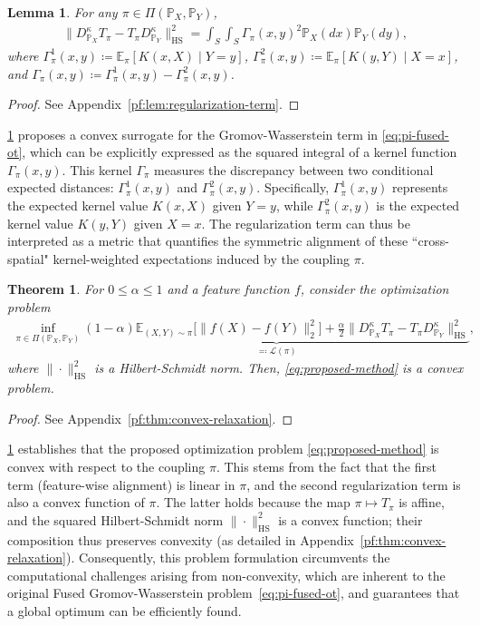 \documentclass{article}
\newtheorem{theorem}{Theorem}
\newtheorem{lemma}{Lemma}
\begin{document}
\begin{lemma}
	\label{lem:regularization-term}
	For any $\pi \in \Pi(\mathbb{P}_X,\mathbb{P}_Y)$,
	\begin{align*}
		\| D_{\mathbb{P}_X}^{\kappa}T_{\pi} - T_{\pi}D_{\mathbb{P}_Y}^{\kappa} \|_{\mathrm{HS}}^2 = \int_S\int_S \Gamma_\pi(x,y)^2\mathbb{P}_X(dx)\mathbb{P}_Y(dy) ,
	\end{align*}
	where $\Gamma_\pi^1(x,y) \coloneqq \mathbb{E}_\pi[K(x,X) \mid Y = y]$, $\Gamma_\pi^2(x,y) \coloneqq \mathbb{E}_\pi[K(y,Y) \mid X = x]$, and $\Gamma_\pi(x,y) \coloneqq \Gamma_\pi^1(x,y) - \Gamma_\pi^2(x,y)$.
\end{lemma}
\begin{proof}
	See Appendix~\ref{pf:lem:regularization-term}.
\end{proof}
\cref{lem:regularization-term} proposes a convex surrogate for the Gromov-Wasserstein term in \eqref{eq:pi-fused-ot}, which can be explicitly expressed as the squared integral of a kernel function $\Gamma_\pi(x,y)$. This kernel $\Gamma_\pi$ measures the discrepancy between two conditional expected distances: $\Gamma_\pi^1(x,y)$ and $\Gamma_\pi^2(x,y)$. Specifically, $\Gamma_\pi^1(x,y)$ represents the expected kernel value $K(x,X)$ given $Y=y$, while $\Gamma_\pi^2(x,y)$ is the expected kernel value $K(y,Y)$ given $X=x$. The regularization term can thus be interpreted as a metric that quantifies the symmetric alignment of these ``cross-spatial" kernel-weighted expectations induced by the coupling $\pi$.

\begin{theorem}
	\label{thm:convex-relaxation}
	For $0 \leq \alpha \leq 1$ and a feature function $f$, consider the optimization problem 
	\begin{align}
		\label{eq:proposed-method}
		\inf_{\pi\in\Pi(\mathbb{P}_X,\mathbb{P}_Y)} \underbrace{(1-\alpha)\mathbb{E}_{(X,Y)\sim\pi}\big[\|f(X)-f(Y)\|_2^2\big] + \frac{\alpha}{2} \| D_{\mathbb{P}_X}^{\kappa}T_\pi - T_\pi D_{\mathbb{P}_Y}^{\kappa} \|_{\mathrm{HS}}^2}_{ \eqqcolon \mathcal{L}(\pi)} ,
	\end{align}
	where $\|\cdot\|_{\mathrm{HS}}^2$ is a Hilbert-Schmidt norm. Then, \eqref{eq:proposed-method} is a convex problem.
\end{theorem}
\begin{proof}
	See Appendix~\ref{pf:thm:convex-relaxation}.
\end{proof}
\cref{thm:convex-relaxation} establishes that the proposed optimization problem \eqref{eq:proposed-method} is convex with respect to the coupling $\pi$. This stems from the fact that the first term (feature-wise alignment) is linear in $\pi$, and the second regularization term is also a convex function of $\pi$. The latter holds because the map $\pi \mapsto T_\pi$ is affine, and the squared Hilbert-Schmidt norm $\|\cdot\|_{\mathrm{HS}}^2$ is a convex function; their composition thus preserves convexity (as detailed in Appendix~\ref{pf:thm:convex-relaxation}). Consequently, this problem formulation circumvents the computational challenges arising from non-convexity, which are inherent to the original Fused Gromov-Wasserstein problem~\eqref{eq:pi-fused-ot}, and guarantees that a global optimum can be efficiently found.
\end{document}
